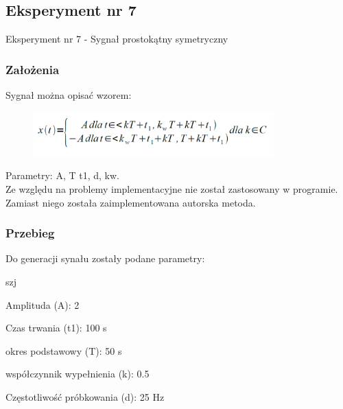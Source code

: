 \documentclass[12pt]{article}
\begin{document}
\subsection{Eksperyment nr 7}

Eksperyment nr 7 - Sygnał prostokątny symetryczny

\subsubsection{Założenia}
Sygnał można opisać wzorem:
\begin{figure}[h!]
 \centering
 \includegraphics[width=9.3cm]{KwadWzorSym.PNG}
 \vspace{-0.3cm}
 \label{gw}
\end{figure}
\newpage
Parametry: A, T t1, d, kw.\\
Ze względu na problemy implementacyjne nie został zastosowany w programie. Zamiast niego została zaimplementowana autorska metoda.

\subsubsection{Przebieg}
Do generacji synału zostały podane parametry:

\begin{labeling}{szj}
\item [Amplituda (A):] 2
\item [Czas trwania (t1):] 100 s
\item [okres podstawowy (T):] 50 s
\item [współczynnik wypełnienia (k):] 0.5
\item [Częstotliwość próbkowania (d): ] 25 Hz
\end{labeling}
\end{document}
